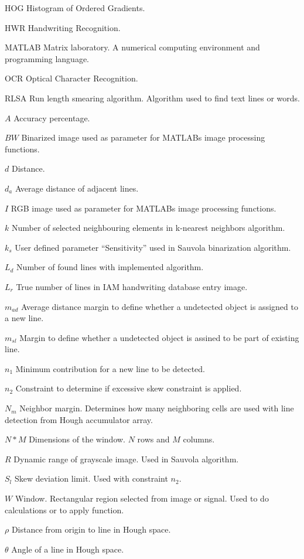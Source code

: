 \documentclass{article}
\begin{document}
   \begin{abbrv}
    \item[HOG] Histogram of Ordered Gradients.
    \item[HWR] Handwriting Recognition.
    \item[MATLAB] Matrix laboratory. A numerical computing environment and programming language.
    \item[OCR] Optical Character Recognition.
    \item[RLSA] Run length smearing algorithm. Algorithm used to find text lines or words.

    \item[$A$] Accuracy percentage.
    \item[$BW$] Binarized image used as parameter for MATLABs image processing functions.
    \item[$d$] Distance.
    \item[$d_a$] Average distance of adjacent lines.
    \item[$I$] RGB image used as parameter for MATLABs image processing functions.
    \item[$k$] Number of selected neighbouring elements in k-nearest neighbors algorithm.
    \item[$k_s$] User defined parameter ``Sensitivity'' used in Sauvola binarization algorithm.
    \item[$L_d$] Number of found lines with implemented algorithm.
    \item[$L_r$] True number of lines in IAM handwriting database entry image.
    \item[$m_{ad}$] Average distance margin to define whether a undetected object is assigned to a new line.
    \item[$m_{sl}$] Margin to define whether a undetected object is assined to be part of existing line.
    \item[$n_1$] Minimum contribution for a new line to be detected.
    \item[$n_2$] Constraint to determine if excessive skew constraint is applied.
    \item[$N_m$] Neighbor margin. Determines how many neighboring cells are used with line detection from Hough accumulator array.
    \item[$N * M$] Dimensions of the window. $N$ rows and $M$ columns.
    \item[$R$] Dynamic range of grayscale image. Used in Sauvola algorithm.
    \item[$S_l$] Skew deviation limit. Used with constraint $n_2$.
    \item[$W$] Window. Rectangular region selected from image or signal. Used to do calculations or to apply function.
    \item[$\rho$] Distance from origin to line in Hough space.
    \item[$\theta$] Angle of a line in Hough space.
   \end{abbrv}
\end{document}
